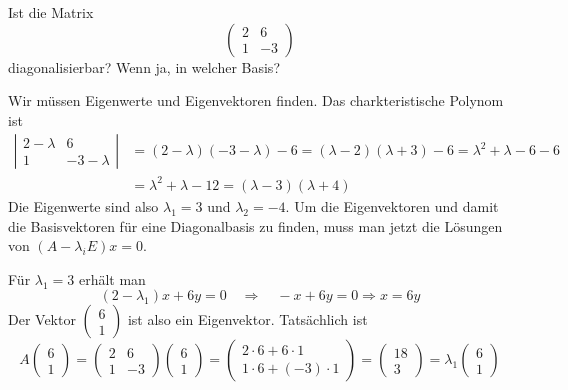 Ist die Matrix
\[
\begin{pmatrix}
2&6\\
1&-3
\end{pmatrix}
\]
diagonalisierbar? Wenn ja, in welcher Basis?


\begin{loesung}
Wir müssen Eigenwerte und Eigenvektoren finden. Das charkteristische
Polynom ist
\begin{align*}
\left|\begin{matrix}
2-\lambda&6\\
1&-3-\lambda
\end{matrix}\right|
&=(2-\lambda)(-3-\lambda)-6=(\lambda-2)(\lambda+3)-6=\lambda^2+\lambda-6-6
\\
&=\lambda^2+\lambda-12=(\lambda-3)(\lambda + 4)
\end{align*}
Die Eigenwerte sind also $\lambda_1=3$ und $\lambda_2=-4$. Um die Eigenvektoren und damit
die Basisvektoren für eine Diagonalbasis zu finden, muss man
jetzt die Lösungen von $(A-\lambda_i E)x=0$.

Für $\lambda_1=3$ erhält man
\[
(2-\lambda_1)x+6y=0\quad\Rightarrow\quad -x+6y=0\Rightarrow x = 6y
\]
Der Vektor
$\begin{pmatrix}6\\1\end{pmatrix}$
ist also ein Eigenvektor. Tatsächlich ist
\[
A\begin{pmatrix}6\\1\end{pmatrix}
=
\begin{pmatrix}
2&6\\
1&-3
\end{pmatrix}
\begin{pmatrix}6\\1\end{pmatrix}
=\begin{pmatrix}
2\cdot 6+6\cdot 1\\
1\cdot 6+(-3)\cdot 1
\end{pmatrix}
=\begin{pmatrix}
18\\
3
\end{pmatrix}
=
\lambda_1 
\begin{pmatrix}6\\1\end{pmatrix}
\]


\end{loesung}
